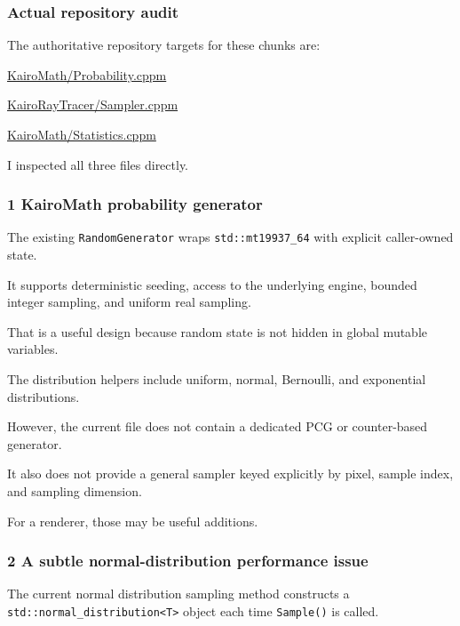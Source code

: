 \subsubsection{Actual repository audit}\label{02-foundations-ii-ch039-actual-repository-audit}

The authoritative repository targets for these chunks are:

\href{https://github.com/swayam8624/KairoMath/blob/master/Probability.cppm?utm_source=chatgpt.com}{KairoMath/Probability.cppm}

\href{https://github.com/swayam8624/KairoRayTracer/blob/main/Sampler.cppm?utm_source=chatgpt.com}{KairoRayTracer/Sampler.cppm}

\href{https://github.com/swayam8624/KairoMath/blob/master/Statistics.cppm?utm_source=chatgpt.com}{KairoMath/Statistics.cppm}

I inspected all three files directly.

\subsubsection{1 KairoMath probability generator}\label{02-foundations-ii-ch039-kairomath-probability-generator}

The existing \texttt{RandomGenerator} wraps \texttt{std::mt19937\_64} with explicit caller-owned state.

It supports deterministic seeding, access to the underlying engine, bounded integer sampling, and uniform real sampling.

That is a useful design because random state is not hidden in global mutable variables.

The distribution helpers include uniform, normal, Bernoulli, and exponential distributions.

However, the current file does not contain a dedicated PCG or counter-based generator.

It also does not provide a general sampler keyed explicitly by pixel, sample index, and sampling dimension.

For a renderer, those may be useful additions.

\subsubsection{2 A subtle normal-distribution performance issue}\label{02-foundations-ii-ch039-a-subtle-normal-distribution-performance-issue}

The current normal distribution sampling method constructs a \texttt{std::normal\_distribution\textless{}T\textgreater{}} object each time \texttt{Sample()} is called.

